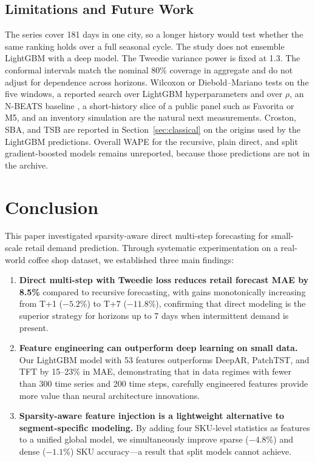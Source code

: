 \documentclass[review,authoryear]{elsarticle}
\begin{document}
\subsection{Limitations and Future Work}

The series cover 181 days in one city, so a longer history would test whether the same ranking holds over a full seasonal cycle. The study does not ensemble LightGBM with a deep model. The Tweedie variance power is fixed at 1.3. The conformal intervals match the nominal 80\% coverage in aggregate and do not adjust for dependence across horizons. Wilcoxon or Diebold--Mariano tests on the five windows, a reported search over LightGBM hyperparameters and over $\rho$, an N-BEATS baseline \citep{oreshkin2020nbeats}, a short-history slice of a public panel such as Favorita or M5, and an inventory simulation are the natural next measurements. Croston, SBA, and TSB are reported in Section~\ref{sec:classical} on the origins used by the LightGBM predictions. Overall WAPE for the recursive, plain direct, and split gradient-boosted models remains unreported, because those predictions are not in the archive.

\section{Conclusion}

This paper investigated sparsity-aware direct multi-step forecasting for small-scale retail demand prediction. Through systematic experimentation on a real-world coffee shop dataset, we established three main findings:

\begin{enumerate}
    \item \textbf{Direct multi-step with Tweedie loss reduces retail forecast MAE by 8.5\%} compared to recursive forecasting, with gains monotonically increasing from T+1 ($-5.2\%$) to T+7 ($-11.8\%$), confirming that direct modeling is the superior strategy for horizons up to 7 days when intermittent demand is present.
    \item \textbf{Feature engineering can outperform deep learning on small data.} Our LightGBM model with 53 features outperforms DeepAR, PatchTST, and TFT by 15--23\% in MAE, demonstrating that in data regimes with fewer than 300 time series and 200 time steps, carefully engineered features provide more value than neural architecture innovations.
    \item \textbf{Sparsity-aware feature injection is a lightweight alternative to segment-specific modeling.} By adding four SKU-level statistics as features to a unified global model, we simultaneously improve sparse ($-4.8$\%) and dense ($-1.1$\%) SKU accuracy---a result that split models cannot achieve.
\end{enumerate}
\end{document}
